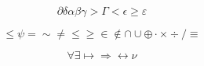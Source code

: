 \[
\partial\delta\alpha\beta\gamma
 > \Gamma
 < \epsilon
 \geq\varepsilon
\]

\[ \leq\psi=\sim\neq\leq\geq\in\notin
\cap\cup\oplus\cdot\times\div/\equiv \]

\[ \forall\exists\mapsto\Rightarrow
\longleftrightarrow\nu \]
